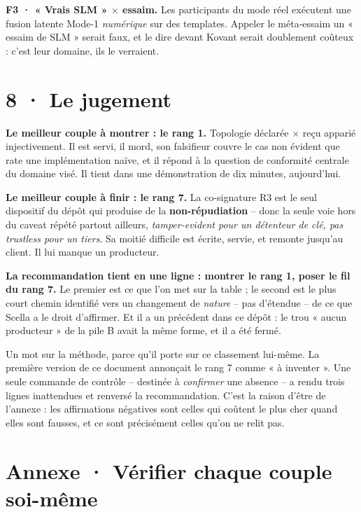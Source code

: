 \documentclass[10pt]{article}
\newcommand{\x}{$\times$}
\begin{document}
\textbf{F3 · « Vrais SLM » \x{} essaim.} Les participants du mode réel exécutent une fusion latente
Mode-1 \emph{numérique} sur des templates. Appeler le méta-essaim un « essaim de SLM » serait faux, et
le dire devant Kovant serait doublement coûteux : c'est leur domaine, ils le verraient.

\section{8 · Le jugement}

\textbf{Le meilleur couple à montrer : le rang 1.} Topologie déclarée \x{} reçu apparié injectivement.
Il est servi, il mord, son falsifieur couvre le cas non évident que rate une implémentation naïve, et
il répond à la question de conformité centrale du domaine visé. Il tient dans une démonstration de dix
minutes, aujourd'hui.

\textbf{Le meilleur couple à finir : le rang 7.} La co-signature R3 est le seul dispositif du dépôt
qui produise de la \textbf{non-répudiation} -- donc la seule voie hors du caveat répété partout
ailleurs, \emph{tamper-evident pour un détenteur de clé, pas trustless pour un tiers}. Sa moitié
difficile est écrite, servie, et remonte jusqu'au client. Il lui manque un producteur.

\begin{acquis}
\textbf{La recommandation tient en une ligne : montrer le rang 1, poser le fil du rang 7.} Le premier
est ce que l'on met sur la table ; le second est le plus court chemin identifié vers un changement de
\emph{nature} -- pas d'étendue -- de ce que Scella a le droit d'affirmer. Et il a un précédent dans ce
dépôt : le trou « aucun producteur » de la pile B avait la même forme, et il a été fermé.
\end{acquis}

Un mot sur la méthode, parce qu'il porte sur ce classement lui-même. La première version de ce
document annonçait le rang 7 comme « à inventer ». Une seule commande de contrôle -- destinée à
\emph{confirmer} une absence -- a rendu trois lignes inattendues et renversé la recommandation. C'est
la raison d'être de l'annexe : les affirmations négatives sont celles qui coûtent le plus cher quand
elles sont fausses, et ce sont précisément celles qu'on ne relit pas.

\section{Annexe · Vérifier chaque couple soi-même}
\end{document}

